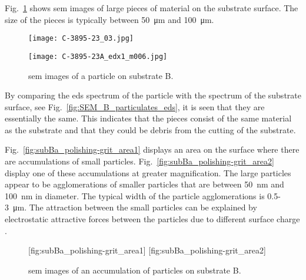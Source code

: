 Fig.~\ref{fig:SEM_B_particulates} shows \ac{sem} images of large pieces of material on the substrate surface. The size of the pieces is typically between \SI{50}{\micro\metre} and \SI{100}{\micro\metre}.

\begin{figure}[htbp]
    \centering
          \begin{minipage}[t]{0.49\linewidth}
            \centering
            \texttt{[image: C-3895-23\_03.jpg]}
          \end{minipage}
          \hfill
          \begin{minipage}[t]{0.49\linewidth}
            \centering
            \texttt{[image: C-3895-23A\_edx1\_m006.jpg]}
          \end{minipage}
        \caption[\Ac{sem} images of a particle on substrate B.]{\Acf{sem} images of a particle on substrate B.}\label{fig:SEM_B_particulates}  
\end{figure}

By comparing the \ac{eds} spectrum of the particle with the spectrum of the substrate surface, see Fig.~\ref{fig:SEM_B_particulates_eds}, it is seen that they are essentially the same. This indicates that the pieces consist of the same material as the substrate and that they could be debris from the cutting of the substrate.

Fig.~\ref{fig:subBa_polishing-grit_area1} displays an area on the surface where there are accumulations of small particles. Fig.~\ref{fig:subBa_polishing-grit_area2} display one of these accumulations at greater magnification. The large particles appear to be agglomerations of smaller particles that are between \SI{50}{\nano\metre} and \SI{100}{\nano\metre} in diameter. The typical width of the particle agglomerations is \SI{0.5}{}-\SI{3}{\micro\metre}. The attraction between the small particles can be explained by electrostatic attractive forces between the particles due to different surface charge \citep{allen2001review}.

\begin{figure}[htbp]
    \centering
        [fig:subBa_polishing-grit_area1]
        [fig:subBa_polishing-grit_area2]
    \caption[\Ac{sem} images of particles on substrate B.]{\Acf{sem} images of an accumulation of particles on substrate B.}\label{fig:subBa_polishing-grit_area}
\end{figure}


